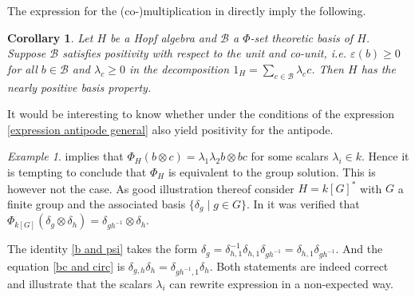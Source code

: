 \documentclass[a4paper,10pt]{amsart}
\newtheorem{corollary}[lemma]{Corollary}
\theoremstyle{definition}
\theoremstyle{remark}
\newtheorem{example}[lemma]{Example}
\newcommand\eps{\varepsilon}
\newcommand\ot{\otimes}
\newcommand\mc{\mathcal}
\begin{document}
The expression for the (co-)multiplication in  directly imply the following.

\begin{corollary}\label{nearly positive}
Let $H$ be a Hopf algebra and $\mc{B}$ a $\Phi$-set theoretic basis of $H$. Suppose $\mc{B}$ satisfies positivity with respect to the unit and co-unit, i.e. $\eps(b) \geq 0$ for all $b \in \mc{B}$ and $\lambda_c \geq 0$ in the decomposition $1_H = \sum_{c \in \mc{B}} \lambda_c c$. Then $H$ has the nearly positive basis property.
\end{corollary}

It would be interesting to know whether under the conditions of  the expression \eqref{expression antipode general} also yield positivity for the antipode.

\begin{example}
 implies that $\Phi_H(b\ot c) = \lambda_1 \lambda_2 b \ot bc $ for some scalars $\lambda_i \in k.$ Hence it is tempting to conclude that $\Phi_H$ is equivalent to the group solution. This is however not the case. As good illustration thereof consider $H = k[G]^*$ with $G$ a finite group and the associated basis $\{ \delta_g \mid g \in G\}.$ In  it was verified that $\Phi_{k[G]}(\delta_g \ot \delta_h) = \delta_{gh^{-1}} \ot \delta_h.$ 

The identity \eqref{b and psi} takes the form $\delta_g = \delta_{h,1}^{-1} \delta_{h,1} \delta_{gh^{-1}} = \delta_{h,1} \delta_{gh^{-1}}$. And the equation \eqref{bc and circ} is $\delta_{g,h}\delta_{h} = \delta_{gh^{-1},1} \delta_h$. Both statements are indeed correct and illustrate that the scalars $\lambda_i$ can rewrite expression in a non-expected way.
\end{example}
\end{document}
